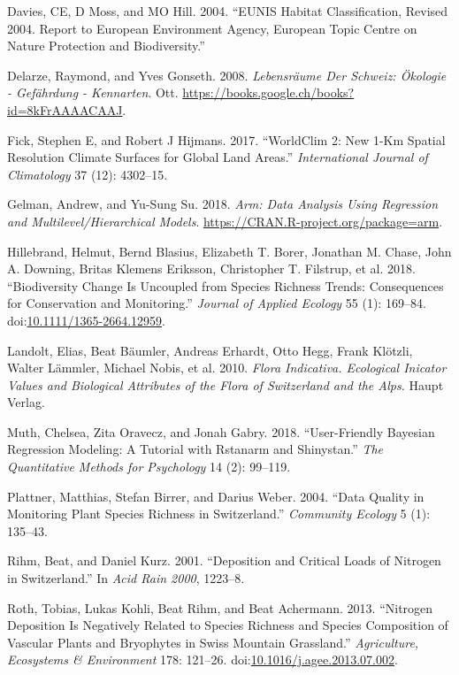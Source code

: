 \documentclass[fleqn,10pt,lineno]{wlpeerj} %
\theoremstyle{definition}
\theoremstyle{definition}
\theoremstyle{definition}
\theoremstyle{remark}
\begin{document}
\hypertarget{ref-Davies2004}{}
Davies, CE, D Moss, and MO Hill. 2004. ``EUNIS Habitat Classification,
Revised 2004. Report to European Environment Agency, European Topic
Centre on Nature Protection and Biodiversity.''

\hypertarget{ref-Delarze2008}{}
Delarze, Raymond, and Yves Gonseth. 2008. \emph{Lebensräume Der Schweiz:
Ökologie - Gefährdung - Kennarten}. Ott.
\url{https://books.google.ch/books?id=8kFrAAAACAAJ}.

\hypertarget{ref-Fick2017}{}
Fick, Stephen E, and Robert J Hijmans. 2017. ``WorldClim 2: New 1-Km
Spatial Resolution Climate Surfaces for Global Land Areas.''
\emph{International Journal of Climatology} 37 (12): 4302--15.

\hypertarget{ref-arm2018}{}
Gelman, Andrew, and Yu-Sung Su. 2018. \emph{Arm: Data Analysis Using
Regression and Multilevel/Hierarchical Models}.
\url{https://CRAN.R-project.org/package=arm}.

\hypertarget{ref-Hillebrand2018}{}
Hillebrand, Helmut, Bernd Blasius, Elizabeth T. Borer, Jonathan M.
Chase, John A. Downing, Britas Klemens Eriksson, Christopher T.
Filstrup, et al. 2018. ``Biodiversity Change Is Uncoupled from Species
Richness Trends: Consequences for Conservation and Monitoring.''
\emph{Journal of Applied Ecology} 55 (1): 169--84.
doi:\href{https://doi.org/10.1111/1365-2664.12959}{10.1111/1365-2664.12959}.

\hypertarget{ref-Landolt2010}{}
Landolt, Elias, Beat Bäumler, Andreas Erhardt, Otto Hegg, Frank Klötzli,
Walter Lämmler, Michael Nobis, et al. 2010. \emph{Flora Indicativa.
Ecological Inicator Values and Biological Attributes of the Flora of
Switzerland and the Alps.} Haupt Verlag.

\hypertarget{ref-Muth2018}{}
Muth, Chelsea, Zita Oravecz, and Jonah Gabry. 2018. ``User-Friendly
Bayesian Regression Modeling: A Tutorial with Rstanarm and Shinystan.''
\emph{The Quantitative Methods for Psychology} 14 (2): 99--119.

\hypertarget{ref-Plattner2004}{}
Plattner, Matthias, Stefan Birrer, and Darius Weber. 2004. ``Data
Quality in Monitoring Plant Species Richness in Switzerland.''
\emph{Community Ecology} 5 (1): 135--43.

\hypertarget{ref-Rihm2001}{}
Rihm, Beat, and Daniel Kurz. 2001. ``Deposition and Critical Loads of
Nitrogen in Switzerland.'' In \emph{Acid Rain 2000}, 1223--8.

\hypertarget{ref-Roth2013}{}
Roth, Tobias, Lukas Kohli, Beat Rihm, and Beat Achermann. 2013.
``Nitrogen Deposition Is Negatively Related to Species Richness and
Species Composition of Vascular Plants and Bryophytes in Swiss Mountain
Grassland.'' \emph{Agriculture, Ecosystems \& Environment} 178: 121--26.
doi:\href{https://doi.org/10.1016/j.agee.2013.07.002}{10.1016/j.agee.2013.07.002}.
\end{document}
